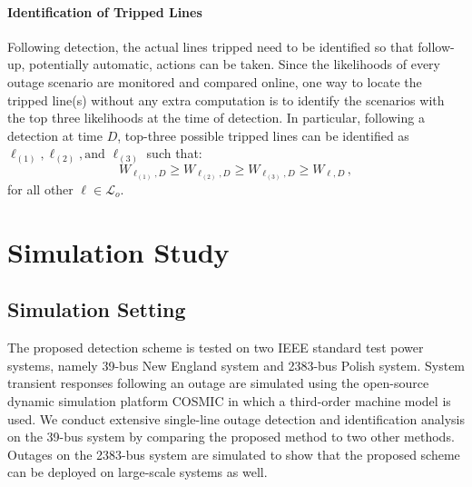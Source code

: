 \paragraph{Identification of Tripped Lines}
Following detection, the actual lines tripped need to be identified so that follow-up, potentially automatic, actions can be taken. 
Since the likelihoods of every outage scenario are monitored and compared online, one way to locate the tripped line(s) without any extra computation is to identify the scenarios with the top three likelihoods at the time of detection. In particular, following a detection at time $D$, top-three possible tripped lines can be identified as $\ell_{(1)}, \ell_{(2)}, \text{and } \ell_{(3)}$ such that:
\begin{equation}
\label{ch3:eqn:identification}
{W}_{\ell_{(1)}, D} \ge {W}_{\ell_{(2)}, D} \ge {W}_{\ell_{(3)}, D} \ge {W}_{\ell, D}\,,
\end{equation} for all other $\ell \in \mathcal{L}_o$.




\section{Simulation Study}
\label{ch3:sec:results}
\subsection{Simulation Setting}
The proposed detection scheme is tested on two IEEE standard test power systems, namely 39-bus New England system \cite{athay1979practical} and 2383-bus Polish system.  System transient responses following an outage are simulated using the open-source dynamic simulation platform COSMIC \cite{Song2016} in which a third-order machine model is used. We conduct extensive single-line outage detection and identification analysis on the 39-bus system by comparing the proposed method to two other methods. Outages on the 2383-bus system are simulated to show that the proposed scheme can be deployed on large-scale systems as well.

